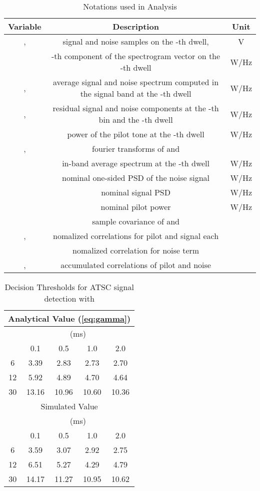 \documentclass[draftclsnofoot,onecolumn,12pt]{IEEEtran}
\begin{document}
\begin{table}\centering
  \caption{Notations used in Analysis}
  \label{tbl:Notations}
  \begin{tabular}{|c|c|c|}
    \hline
	Variable & Description & Unit \\ \hline
,  & signal and noise samples on the -th dwell,  & V \\
	 & -th component of the spectrogram vector on the -th dwell  & W/Hz \\
	,  & average signal and noise spectrum computed in the signal band at the -th dwell & W/Hz \\
	,  & residual signal and noise components at the -th bin and the -th dwell & W/Hz \\
	  & power of the pilot tone at the -th dwell & W/Hz \\
	,  & fourier transforms of  and  & \\
	 & in-band average spectrum at the -th dwell & W/Hz \\
	 & nominal one-sided PSD of the noise signal & W/Hz \\
	 	   & nominal signal PSD & W/Hz \\
	 & nominal pilot power & W/Hz \\
	 & sample covariance of  and  & \\
	,  & nomalized correlations for pilot and signal each & \\
	 & nomalized correlation for noise term & \\
	,  & accumulated correlations of pilot and noise & \\ \hline
  \end{tabular}
\end{table}


\begin{table}\centering
  \caption{Decision Thresholds for ATSC signal detection with }
  \label{tbl:DecThr}
  \begin{tabular}{|c|c|c|c|c|}
    \hline
    \multicolumn{5}{|c|}{Analytical Value (\ref{eq:gamma})} \\ \hline
    \multirow{2}{0.5cm}{}& \multicolumn{4}{c|}{ (ms)} \\ \cline{2-5}
    	& 0.1    & 0.5   & 1.0   & 2.0 \\ \hline
	6	&  3.39  & 2.83  & 2.73  & 2.70 \\ \hline
	12	&  5.92  & 4.89  & 4.70  & 4.64 \\ \hline
	30	&  13.16 & 10.96 & 10.60 & 10.36 \\ \hline \hline
    \multicolumn{5}{|c|}{Simulated Value}  \\ \hline
    \multirow{2}{0.5cm}{}& \multicolumn{4}{c|}{ (ms)} \\ \cline{2-5}
    	& 0.1    & 0.5   & 1.0   & 2.0 \\ \hline
     	6	& 3.59     & 3.07    & 2.92   & 2.75 \\ \hline
     	12	& 6.51     & 5.27    & 4.29   & 4.79 \\ \hline
    	30	& 14.17    & 11.27   & 10.95  & 10.62 \\ \hline
  \end{tabular}
\end{table}
\end{document}

